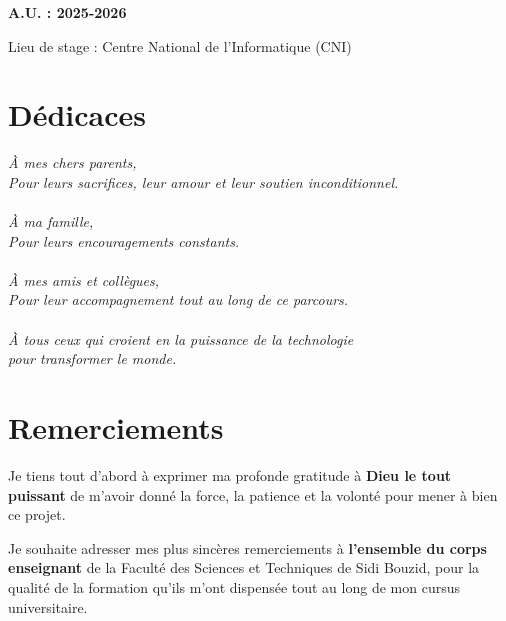 \documentclass[12pt,a4paper]{report}
\begin{document}
\begin{titlepage}
\begin{center}
\vspace{1.5cm}

{\Large\bfseries A.U. : 2025-2026\\}

\vfill

{\Large Lieu de stage : Centre National de l'Informatique (CNI)\\}

\end{center}
\end{titlepage}

\chapter*{Dédicaces}

\vspace{1cm}

\begin{flushright}
\emph{
À mes chers parents,\\
Pour leurs sacrifices, leur amour et leur soutien inconditionnel.\\
\\
À ma famille,\\
Pour leurs encouragements constants.\\
\\
À mes amis et collègues,\\
Pour leur accompagnement tout au long de ce parcours.\\
\\
À tous ceux qui croient en la puissance de la technologie\\
pour transformer le monde.\\
}
\end{flushright}

\chapter*{Remerciements}

\vspace{0.5cm}

Je tiens tout d'abord à exprimer ma profonde gratitude à \textbf{Dieu le tout puissant} de m'avoir donné la force, la patience et la volonté pour mener à bien ce projet.

Je souhaite adresser mes plus sincères remerciements à \textbf{l'ensemble du corps enseignant} de la Faculté des Sciences et Techniques de Sidi Bouzid, pour la qualité de la formation qu'ils m'ont dispensée tout au long de mon cursus universitaire.
\end{document}

